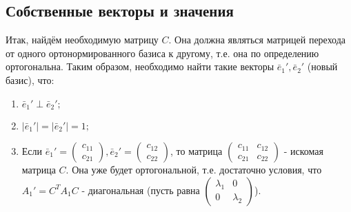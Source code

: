 \documentclass[a4paper, 12pt]{article}
\theoremstyle{definition}
\begin{document}
	\subsection{Собственные векторы и значения}
	Итак, найдём необходимую матрицу $C$. Она должна являться матрицей перехода от одного ортонормированного базиса к другому, т.е. она по определению ортогональна. Таким образом, необходимо найти такие векторы $\bar{e}_{1}', \bar{e}_{2}'$ (новый базис), что: \begin{enumerate}
		\item $\bar{e}_{1}' \perp \bar{e}_{2}';$
		\item $|\bar{e}_{1}'| = |\bar{e}_{2}'| = 1;$
		\item Если $\bar{e}_{1}' = \begin{pmatrix} c_{11} \\ c_{21} \end{pmatrix}, \bar{e}_{2}' = \begin{pmatrix} c_{12} \\ c_{22} \end{pmatrix}$, то матрица $\begin{pmatrix} c_{11}&c_{12} \\ c_{21}&c_{22} \end{pmatrix}$ - искомая матрица $C$. Она уже будет ортогональной, т.е. достаточно условия, что $A_1' = C^TA_1C$ - диагональная (пусть равна $\begin{pmatrix} \lambda_1&0 \\ 0&\lambda_2 \end{pmatrix}$).
	\end{enumerate}
\end{document}
